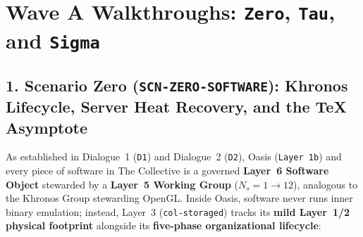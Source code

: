 \section{Wave A Walkthroughs: \texttt{Zero}, \texttt{Tau}, and \texttt{Sigma}}
\label{sec:ch10-wave-a}

\subsection{1. Scenario Zero (\texttt{SCN-ZERO-SOFTWARE}): Khronos Lifecycle, Server Heat Recovery, and the TeX Asymptote}
As established in Dialogue~1 (\texttt{D1}) and Dialogue~2 (\texttt{D2}), Oasis (\texttt{Layer 1b}) and every piece of software in The Collective is a governed \textbf{Layer~6 Software Object} stewarded by a \textbf{Layer~5 Working Group} ($N_s = 1 \to 12$), analogous to the Khronos Group stewarding OpenGL. Inside Oasis, software never runs inner binary emulation; instead, Layer~3 (\texttt{col-storaged}) tracks its \textbf{mild Layer~1/2 physical footprint} alongside its \textbf{five-phase organizational lifecycle}:
